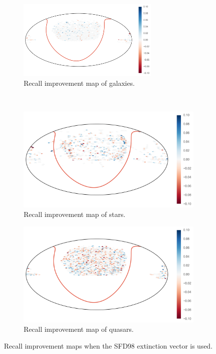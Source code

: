 \begin{figure}[p]
	\centering
	\begin{subfigure}{\textwidth}
		\centering
		\includegraphics[width=0.75\textwidth]{figures/appendix/map_recall_sfd98_Galaxy}
		\caption{Recall improvement map of galaxies.}
		\label{fig:map_recall_sfd98_galaxies}
	\end{subfigure}\\
	\begin{subfigure}{\textwidth}
		\centering
		\includegraphics[width=0.75\linewidth]{figures/appendix/map_recall_sfd98_Star}
		\caption{Recall improvement map of stars.}
		\label{fig:map_recall_sfd98_stars}
	\end{subfigure}
	\begin{subfigure}{\textwidth}
		\centering
		\includegraphics[width=0.75\linewidth]{figures/appendix/map_recall_sfd98_Quasar}
		\caption{Recall improvement map of quasars.}
		\label{fig:map_recall_sfd98_quasars}
	\end{subfigure}
	\caption[Recall improvement maps with SFD98]{
        Recall improvement maps when the SFD98 extinction vector is used.}
	\label{fig:map_recall_sfd98}
\end{figure}


